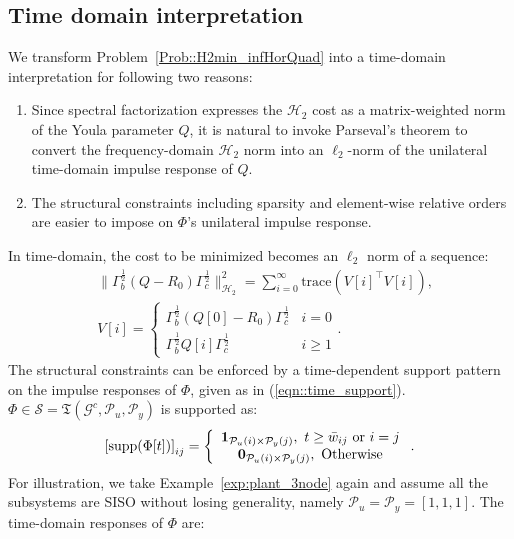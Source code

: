 \subsection{Time domain interpretation}
We transform Problem~\ref{Prob::H2min_infHorQuad} into a time-domain interpretation for following two reasons:
\begin{enumerate}
    \item Since spectral factorization expresses the \(\mathcal{H}_2\) cost as a matrix-weighted norm of the Youla parameter \(Q\), it is natural to invoke Parseval’s theorem to convert the frequency-domain \(\mathcal{H}_2\) norm into an \(\ell_2\)-norm of the unilateral time-domain impulse response of \(Q\).
    \item The structural constraints including sparsity and element-wise relative orders are easier to impose on \(\Phi\)'s unilateral impulse response. 
\end{enumerate}
In time-domain, the cost to be minimized becomes an \(\ell_2\) norm of a sequence:
\begin{equation*}
\begin{split}
    & \|\Gamma_b^{\frac{1}{2}}(Q-R_0) \Gamma_c^{\frac{1}{2}}\|_{\mathcal{H}_2}^2 = \sum_{i = 0}^\infty \mathrm{trace}(V[i]^\top V[i]), \\
    & V[i] = \left\{\begin{array}{cc}
        \Gamma_b^{\frac{1}{2}}(Q[0]-R_0) \Gamma_c^{\frac{1}{2}} & i = 0\\
        \Gamma_b^{\frac{1}{2}}Q[i] \Gamma_c^{\frac{1}{2}} & i \geq 1
    \end{array}\right. .
\end{split}  
\end{equation*}
The structural constraints can be enforced by a time-dependent support pattern on the impulse responses of \(\Phi\), given as in (\ref{eqn::time_support}).
\(\Phi\in \mathcal{S} = \mathfrak{T}(\mathcal{G}^c,\mathcal{P}_u,\mathcal{P}_y)\) is supported as:
\begin{equation}\label{eqn::time_support}
\left[\supp(\Phi[t])\right]_{ij} = \left\{\begin{array}{c}
    \mathbf{1}_{\mathcal{P}_u(i)\times \mathcal{P}_y(j)},\ t \geq \bar{w}_{ij} \text{ or } i = j\\
    \mathbf{0}_{\mathcal{P}_u(i)\times \mathcal{P}_y(j)},\ \text{Otherwise}
\end{array}\right. .
\end{equation}
For illustration, we take Example~\ref{exp:plant_3node} again and assume all the subsystems are SISO without losing generality, namely \(\mathcal{P}_u=\mathcal{P}_y =[1,1,1]\). The time-domain responses of \(\Phi\) are:
